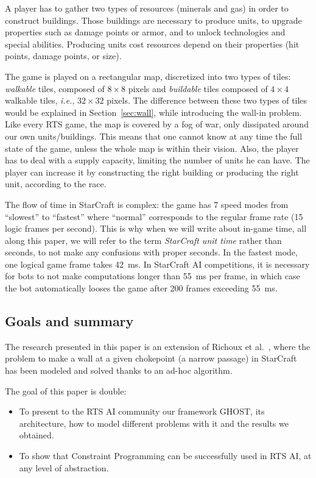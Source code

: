 \documentclass[journal]{IEEEtran}
\newcommand{\ghost}{\textsc{GHOST}\xspace}
\newcommand{\ie}{\textit{i.e.}}
\begin{document}
A player  has to  gather two  types of resources (minerals and  gas) in
order   to  construct   buildings. Those buildings are necessary to produce  units, to  upgrade
properties such as damage points or armor, and to unlock technologies
and special abilities. Producing units cost resources depend on their properties (hit points, damage points, or size).

The game  is played on  a rectangular map,  discretized into two  types of
tiles: \emph{walkable}  tiles, composed of  $8 \times  8$ pixels and  \emph{buildable} tiles
composed of $4  \times 4$ walkable tiles, \ie, $32  \times 32$ pixels. The
difference  between these  two types  of tiles  would be  explained in
Section~\ref{sec:wall},  while introducing  the wall-in  problem. Like
every RTS game, the map is covered by a fog of war, only dissipated
around our own units/buildings. This means that one cannot know at any
time the full state of the game, unless the whole map is within their vision.   Also, the player has to deal with a supply capacity, limiting the number of  units he can have. The player
can increase  it by constructing  the right building or  producing the
right unit, according to the race.

The flow of time in StarCraft is complex:  the game has 7  speed modes from
``slowest'' to ``fastest'' where ``normal'' corresponds to the regular
 frame rate  (15 logic frames per  second). This is why when we will  write about in-game time, all along this
paper, we will refer to the term \emph{StarCraft unit time} rather than
seconds, to not make any confusions with proper seconds. In the fastest
mode, one logical game  frame takes 42~ms. In StarCraft AI  competitions, it is
necessary  for bots  to not  make  computations longer  than 55~ms  per
frame, in which  case the bot automatically looses the  game after 200
frames exceeding 55~ms.

\subsection{Goals and summary}

The research  presented in this  paper is  an extension of  Richoux et
al.~\cite{RichouxUO14}, where  the problem to  make a wall at  a given
chokepoint (a narrow passage) in StarCraft  has been  modeled  and solved  thanks to  an
ad-hoc algorithm.

The goal of this paper is double:
\begin{itemize}
\item  To present  to  the RTS  AI community  our  framework \ghost,  its
  architecture,  how  to model  different  problems  with it  and  the
  results we obtained.
\item To show that Constraint  Programming can be successfully used in
  RTS AI, at any level of abstraction.
\end{itemize}
\end{document}
